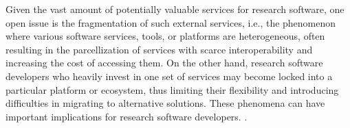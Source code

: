 Given the vast amount of potentially valuable services for research software, one open issue is the fragmentation of such external services, i.e., the phenomenon where various software services, tools, or platforms are heterogeneous, often resulting in the parcellization of services with scarce interoperability and increasing the cost of accessing them. On the other hand, research software developers who heavily invest in one set of services may become locked into a particular platform or ecosystem, thus limiting their flexibility and introducing difficulties in migrating to alternative solutions. These phenomena can have important implications for research software developers. .

